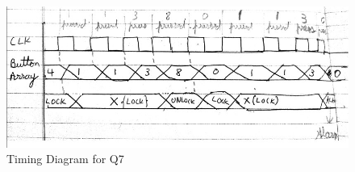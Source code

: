 \documentclass[11pt,a4paper]{article}
\begin{document}
	\begin{figure}[H]
		\centering
		\includegraphics[width=1\linewidth]{images/q7timing}
		\caption[]{Timing Diagram for Q7}
		\label{fig:q7timing}
	\end{figure}
\end{document}
